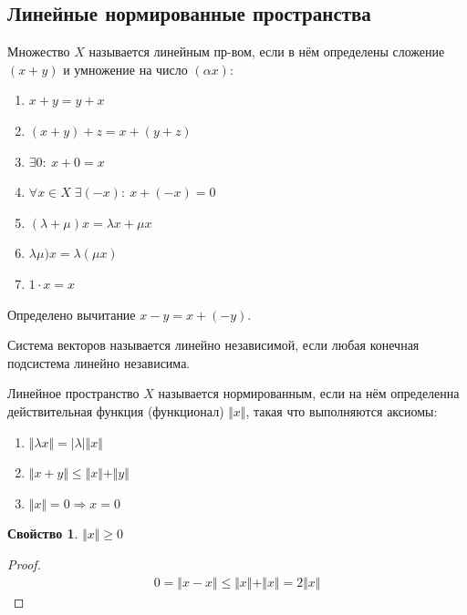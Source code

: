 \documentclass{article}
\theoremstyle{definition}
\numberwithin{theorem}{section}
\numberwithin{lemma}{section}
\numberwithin{definition}{section}
\numberwithin{corollary}{section}
\newtheorem*{property}{Свойство}
\numberwithin{equation}{section}
\let\implies\Rightarrow
\begin{document}
\subsection{Линейные нормированные пространства}
\begin{definition}
  Множество $X$ называется линейным пр-вом,
  если в нём определены сложение $(x+y)$ и умножение на число $(\alpha x)$:
  \begin{enumerate}
    \item $x+y=y+x$
    \item $(x+y)+z=x+(y+z)$
    \item $\exists 0: \: x+0=x$
    \item $\forall x \in X \; \exists (-x): \: x+(-x)=0$
    \item $(\lambda+\mu)x=\lambda x+ \mu x$
    \item $\lambda \mu)x=\lambda(\mu x)$
    \item $1 \cdot x=x$
  \end{enumerate}
  Определено вычитание $x-y=x+(-y)$.
\end{definition}
\begin{definition}
  Система векторов называется линейно независимой, если
  любая конечная подсистема линейно независима.
\end{definition}
\begin{definition}
  Линейное пространство $X$ называется нормированным, если
  на нём определенна действительная функция (функционал) $\Vert x \Vert$,
  такая что выполняются аксиомы:
  \begin{enumerate}
    \item $\Vert \lambda x \Vert=|\lambda|\Vert x \Vert   $
    \item $\Vert x+y \Vert \le \Vert x \Vert + \Vert y \Vert$
    \item $\Vert x \Vert=0 \implies x=0$
  \end{enumerate}
\end{definition}
\begin{property}
  $\Vert x \Vert \ge 0$
\end{property}
\begin{proof}
  \begin{gather*}
    0 = \Vert x-x \Vert \le \Vert x \Vert+\Vert x \Vert = 2 \Vert x \Vert
  \end{gather*}
\end{proof}

\end{document}
